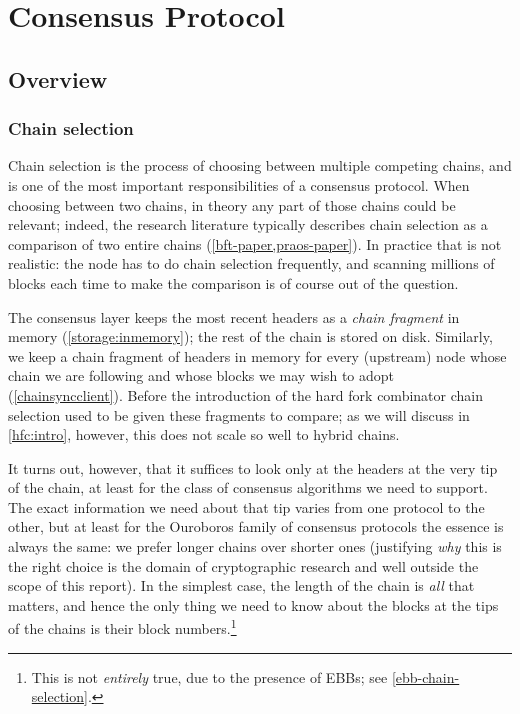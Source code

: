 \chapter{Consensus Protocol}
\label{consensus}


%
%

\section{Overview}

\subsection{Chain selection}
\label{consensus:overview:chainsel}

Chain selection is the process of choosing between multiple competing chains,
and is one of the most important responsibilities of a consensus protocol. When
choosing between two chains, in theory any part of those chains could be
relevant; indeed, the research literature typically describes chain selection as
a comparison of two entire chains (\cref{bft-paper,praos-paper}). In practice
that is not realistic: the node has to do chain selection frequently, and
scanning millions of blocks each time to make the comparison is of course out of
the question.

The consensus layer keeps the most recent headers as a \emph{chain fragment}
in memory (\cref{storage:inmemory}); the rest of the chain is stored on disk.
Similarly, we keep a chain fragment of headers in memory for every (upstream)
node whose chain we are following and whose blocks we may wish to adopt
(\cref{chainsyncclient}). Before the introduction of the hard fork combinator
chain selection used to be given these fragments to compare; as we will discuss
in \cref{hfc:intro}, however, this does not scale so well to hybrid chains.

It turns out, however, that it suffices to look only at the headers at the very
tip of the chain, at least for the class of consensus algorithms we need to
support. The exact information we need about that tip varies from
one protocol to the other, but at least for the Ouroboros family of consensus
protocols the essence is always the same: we prefer longer chains over shorter
ones (justifying \emph{why} this is the right choice is the domain  of
cryptographic research and well outside the scope of this report). In the
simplest case, the length of the chain is \emph{all} that matters, and hence the
only thing we need to know about the blocks at the tips of the chains is their
block numbers.\footnote{This is not \emph{entirely} true, due to the presence of
EBBs; see \cref{ebb-chain-selection}.}

